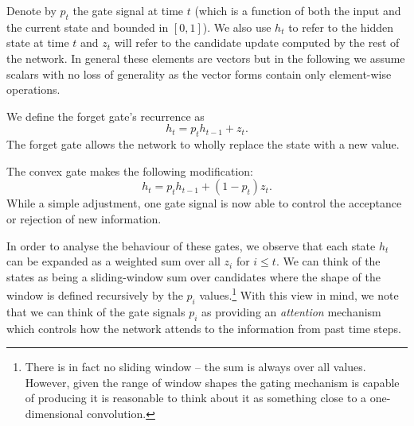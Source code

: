 Denote by \(p_t\) the gate signal at time \(t\) (which is a
function of both the input and the current state and bounded in \([0, 1]\)). We also use
\(h_t\) to refer to the hidden state at time \(t\) and \(z_t\) will
refer to the candidate update computed by the rest of the network. In general these
elements are vectors but in the following we assume scalars with no loss of generality as
the vector forms contain only element-wise operations.

We define the
forget gate's recurrence as
\begin{equation}
	h_t = p_th_{t-1} + z_t.
	\label{eq:forgetgate}
\end{equation} The forget gate allows the network to wholly replace the
state with a new value.

The convex gate makes the following modification:
\begin{equation}
	h_t = p_th_{t-1} + (1-p_t)z_t.
	\label{eq:cvexgate}
\end{equation} While a simple adjustment, one gate signal is now able
to control the acceptance or rejection of new information.

In order to analyse the behaviour of these gates, we observe that each state \(h_t\)
can be expanded as a weighted sum over all \(z_i\) for \(i \leq t\). We can think of
the states as being a sliding-window sum over candidates where the shape of the window is defined
recursively by the \(p_i\) values.\footnote{There is in fact no sliding window -- the sum is always
over all values. However, given the range of window shapes the gating mechanism is capable of producing
it is reasonable to think about it as something close to a one-dimensional convolution.}
With this view in mind, we note that we can think of the
gate signals \(p_i\) as providing an \emph{attention} mechanism which controls how the network
attends to the information from past time steps.


